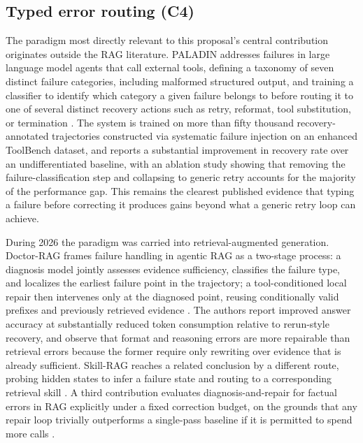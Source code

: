 \documentclass[10pt,twocolumn,letterpaper]{article}
\begin{document}
\subsection{Typed error routing (C4)}

The paradigm most directly relevant to this proposal's central contribution originates outside the RAG literature. PALADIN addresses failures in large language model agents that call external tools, defining a taxonomy of seven distinct failure categories, including malformed structured output, and training a classifier to identify which category a given failure belongs to before routing it to one of several distinct recovery actions such as retry, reformat, tool substitution, or termination \cite{paladin}. The system is trained on more than fifty thousand recovery-annotated trajectories constructed via systematic failure injection on an enhanced ToolBench dataset, and reports a substantial improvement in recovery rate over an undifferentiated baseline, with an ablation study showing that removing the failure-classification step and collapsing to generic retry accounts for the majority of the performance gap. This remains the clearest published evidence that typing a failure before correcting it produces gains beyond what a generic retry loop can achieve.

During 2026 the paradigm was carried into retrieval-augmented generation. Doctor-RAG frames failure handling in agentic RAG as a two-stage process: a diagnosis model jointly assesses evidence sufficiency, classifies the failure type, and localizes the earliest failure point in the trajectory; a tool-conditioned local repair then intervenes only at the diagnosed point, reusing conditionally valid prefixes and previously retrieved evidence \cite{doctorrag}. The authors report improved answer accuracy at substantially reduced token consumption relative to rerun-style recovery, and observe that format and reasoning errors are more repairable than retrieval errors because the former require only rewriting over evidence that is already sufficient. Skill-RAG reaches a related conclusion by a different route, probing hidden states to infer a failure state and routing to a corresponding retrieval skill \cite{skillrag}. A third contribution evaluates diagnosis-and-repair for factual errors in RAG explicitly under a fixed correction budget, on the grounds that any repair loop trivially outperforms a single-pass baseline if it is permitted to spend more calls \cite{budgetrepair}.
\end{document}
